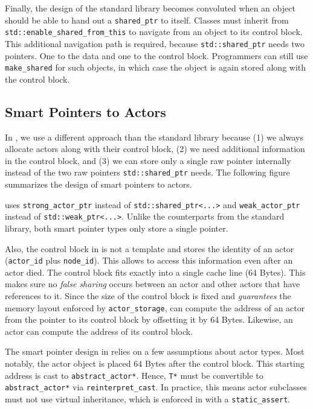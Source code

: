 
Finally, the design of the standard library becomes convoluted when an object
should be able to hand out a \lstinline^shared_ptr^ to itself. Classes must
inherit from \lstinline^std::enable_shared_from_this^ to navigate from an
object to its control block. This additional navigation path is required,
because \lstinline^std::shared_ptr^ needs two pointers. One to the data and one
to the control block. Programmers can still use \lstinline^make_shared^ for
such objects, in which case the object is again stored along with the control
block.

\subsection{Smart Pointers to Actors}

In \lib, we use a different approach than the standard library because (1) we
always allocate actors along with their control block, (2) we need additional
information in the control block, and (3) we can store only a single raw
pointer internally instead of the two raw pointers \lstinline^std::shared_ptr^
needs. The following figure summarizes the design of smart pointers to actors.


\lib uses \lstinline^strong_actor_ptr^ instead of
\lstinline^std::shared_ptr<...>^ and \lstinline^weak_actor_ptr^ instead of
\lstinline^std::weak_ptr<...>^. Unlike the counterparts from the standard
library, both smart pointer types only store a single pointer.

Also, the control block in \lib is not a template and stores the identity of an
actor (\lstinline^actor_id^ plus \lstinline^node_id^). This allows \lib to
access this information even after an actor died. The control block fits
exactly into a single cache line (64 Bytes). This makes sure no \emph{false
sharing} occurs between an actor and other actors that have references to it.
Since the size of the control block is fixed and \lib \emph{guarantees} the
memory layout enforced by \lstinline^actor_storage^, \lib can compute the
address of an actor from the pointer to its control block by offsetting it by
64 Bytes. Likewise, an actor can compute the address of its control block.

The smart pointer design in \lib relies on a few assumptions about actor types.
Most notably, the actor object is placed 64 Bytes after the control block. This
starting address is cast to \lstinline^abstract_actor*^. Hence, \lstinline^T*^
must be convertible to \lstinline^abstract_actor*^ via
\lstinline^reinterpret_cast^. In practice, this means actor subclasses must not
use virtual inheritance, which is enforced in \lib with a
\lstinline^static_assert^.

